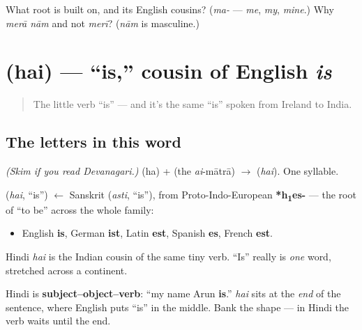 \begin{tcolorbox}[breakable,colback=teal!4,colframe=teal!35!black,title={Before you move on}]
What root is \textbf{} built on, and its English cousins? (\emph{ma-} — \emph{me}, \emph{my}, \emph{mine}.) Why \emph{merā nām} and not \emph{merī}? (\emph{nām} is masculine.)
\end{tcolorbox}
\section[\texorpdfstring{\hi{है} (hai)}{है (hai)}]{ (hai) — \textquotedblleft{}is,\textquotedblright{} cousin of English \emph{is}}

\label{lesson:HI-C02-hai}



\begin{quote}
The little verb \textquotedblleft{}is\textquotedblright{} — and it's the same \textquotedblleft{}is\textquotedblright{} spoken from Ireland to India.
\end{quote}

\subsection*{The letters in this word}
\emph{(Skim if you read Devanagari.)} \textbf{} (ha) + \textbf{} (the \emph{ai}-mātrā) $\to$ \textbf{} (\emph{hai}). One syllable.

\begin{cousinweb}
\textbf{} (\emph{hai}, \textquotedblleft{}is\textquotedblright{}) $\leftarrow$ Sanskrit \textbf{} (\emph{asti}, \textquotedblleft{}is\textquotedblright{}), from Proto-Indo-European \textbf{*h\textsubscript{1}es-} — the root of \textquotedblleft{}to be\textquotedblright{} across the whole family:

\begin{itemize}
\raggedright
  \item English \textbf{is}, German \textbf{ist}, Latin \textbf{est}, Spanish \textbf{es}, French \textbf{est}.
\end{itemize}

Hindi \emph{hai} is the Indian cousin of the same tiny verb. \textquotedblleft{}Is\textquotedblright{} really is \emph{one} word, stretched across a continent.
\end{cousinweb}

\begin{grammarlens}[title={Grammar Lens: the verb comes last}]
Hindi is \textbf{subject–object–verb}: \textquotedblleft{}my name Arun \textbf{is}.\textquotedblright{} \emph{hai} sits at the \emph{end} of the sentence, where English puts \textquotedblleft{}is\textquotedblright{} in the middle. Bank the shape — in Hindi the verb waits until the end.
\end{grammarlens}


